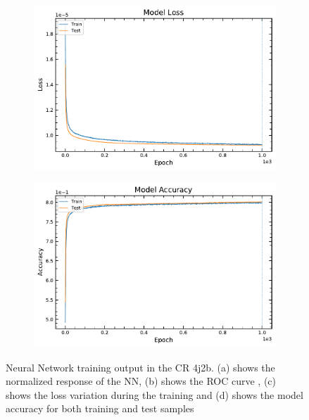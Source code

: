 \begin{figure}[!h]
\begin{subfigure}[b]{0.5\linewidth}
    \caption{} 
    \label{CR:4j2b:ROC} 
  \end{subfigure} 
  \vspace*{-0.4cm}
  \begin{subfigure}[b]{0.5\linewidth}
    \centering
    \includegraphics[width=\linewidth]{ubonn-thesis/Chapters/Chapters_06/Figure/CR_4j2b/loss_PLV_4j2b_L27_20_10_06Oct2021.pdf} %
    \caption{} 
    \label{CR:4j2b:loss} 
  \end{subfigure}%
  \begin{subfigure}[b]{0.5\linewidth}
    \centering
    \includegraphics[width=\linewidth]{ubonn-thesis/Chapters/Chapters_06/Figure/CR_4j2b/acc_PLV_4j2b_L27_20_10_06Oct2021.pdf} 
    \caption{} 
    \label{CR:4j2b:acc} 
  \end{subfigure} 
  \vspace*{-0.3cm}
  \caption{Neural Network training output in the CR 4j2b. (a) shows the normalized response of the NN, (b) shows the ROC curve , (c) shows the loss variation during the training and (d) shows the model accuracy for both training and test samples}
  \label{CR:4j2b:NN} 
\end{figure}



